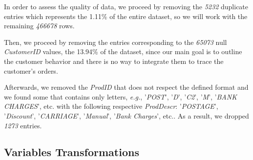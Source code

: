 In order to assess the quality of data, we proceed by removing the \emph{5232} duplicate entries which represents the 1.11\% of the entire dataset, so we will work with the remaining \emph{466678} rows.

Then, we proceed by removing the entries corresponding to the \emph{65073} null \emph{CustomerID} values, the 13.94\% of the dataset, since our main goal is to outline the customer behavior and there is no way to integrate them to trace the customer's orders.

Afterwards, we removed the \emph{ProdID} that does not respect the defined format and we found some that contains only letters, \emph{e.g.}, '\emph{POST}', '\emph{D}', '\emph{C2}', '\emph{M}', '\emph{BANK CHARGES}', etc. with the following respective \emph{ProdDescr}: '\emph{POSTAGE}', '\emph{Discount}', '\emph{CARRIAGE}', '\emph{Manual}', '\emph{Bank Charges}', etc.. As a result, we dropped \emph{1273} entries.

\subsection{Variables Transformations}

